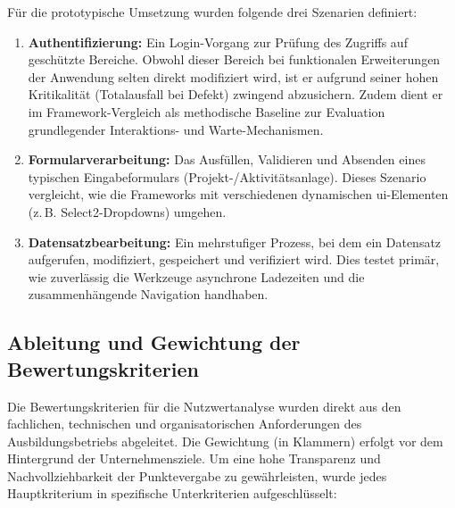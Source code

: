 Für die prototypische Umsetzung wurden folgende drei Szenarien definiert:
\begin{enumerate}
    \item \textbf{Authentifizierung:} Ein Login-Vorgang zur Prüfung des Zugriffs auf geschützte Bereiche. Obwohl dieser Bereich bei funktionalen Erweiterungen der Anwendung selten direkt modifiziert wird, ist er aufgrund seiner hohen Kritikalität (Totalausfall bei Defekt) zwingend abzusichern. Zudem dient er im Framework-Vergleich als methodische Baseline zur Evaluation grundlegender Interaktions- und Warte-Mechanismen.
    
    \item \textbf{Formularverarbeitung:} Das Ausfüllen, Validieren und Absenden eines typischen Eingabeformulars (Projekt-/Aktivitätsanlage). Dieses Szenario vergleicht, wie die Frameworks mit verschiedenen dynamischen \gls{ui}-Elementen (z.\,B. Select2-Dropdowns) umgehen.
    
    \item \textbf{Datensatzbearbeitung:} Ein mehrstufiger Prozess, bei dem ein Datensatz aufgerufen, modifiziert, gespeichert und verifiziert wird. Dies testet primär, wie zuverlässig die Werkzeuge asynchrone Ladezeiten und die zusammenhängende Navigation handhaben.
\end{enumerate}

\subsection{Ableitung und Gewichtung der Bewertungskriterien}
Die Bewertungskriterien für die Nutzwertanalyse wurden direkt aus den fachlichen, technischen und organisatorischen Anforderungen des Ausbildungsbetriebs abgeleitet. Die Gewichtung (in Klammern) erfolgt vor dem Hintergrund der Unternehmensziele. Um eine hohe Transparenz und Nachvollziehbarkeit der Punktevergabe zu gewährleisten, wurde jedes Hauptkriterium in spezifische Unterkriterien aufgeschlüsselt:

